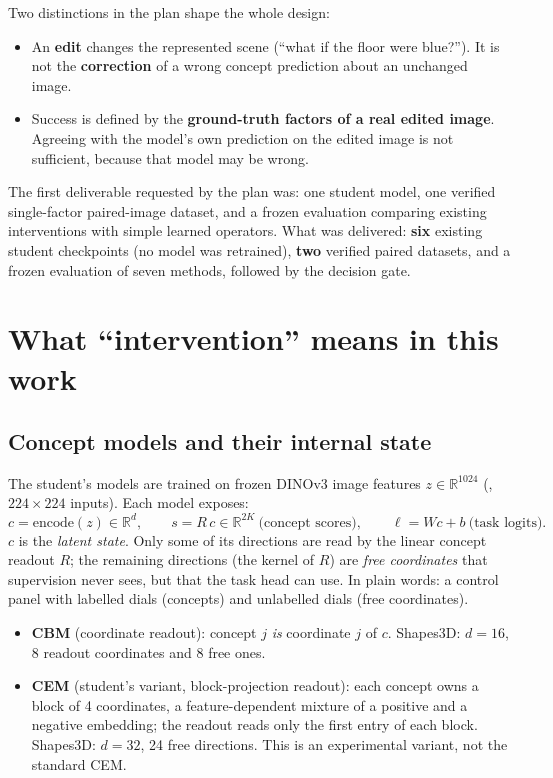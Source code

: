 \documentclass[11pt,a4paper]{article}
\newcommand{\code}[1]{\texttt{\detokenize{#1}}}
\begin{document}
Two distinctions in the plan shape the whole design:
\begin{itemize}
\item An \textbf{edit} changes the represented scene (``what if the floor were blue?''). It is not the
  \textbf{correction} of a wrong concept prediction about an unchanged image.
\item Success is defined by the \textbf{ground-truth factors of a real edited image}. Agreeing with the model's own
  prediction on the edited image is not sufficient, because that model may be wrong.
\end{itemize}

The first deliverable requested by the plan was: one student model, one verified single-factor paired-image dataset,
and a frozen evaluation comparing existing interventions with simple learned operators. What was delivered:
\textbf{six} existing student checkpoints (no model was retrained), \textbf{two} verified paired datasets, and a frozen
evaluation of seven methods, followed by the decision gate.

\section{What ``intervention'' means in this work}
\label{sec:intervention}

\subsection{Concept models and their internal state}

The student's models are trained on frozen DINOv3 image features $z\in\mathbb{R}^{1024}$
(\code{facebook/dinov3-vitl16-pretrain-lvd1689m}, $224\times224$ inputs). Each model exposes:
\[
c = \mathrm{encode}(z)\in\mathbb{R}^{d},\qquad
s = R\,c\in\mathbb{R}^{2K}\ \text{(concept scores)},\qquad
\ell = W c + b\ \text{(task logits)}.
\]
$c$ is the \emph{latent state}. Only some of its directions are read by the linear concept readout $R$; the
remaining directions (the kernel of $R$) are \emph{free coordinates} that supervision never sees, but that the task
head can use. In plain words: a control panel with labelled dials (concepts) and unlabelled dials (free coordinates).

\begin{itemize}
\item \textbf{CBM} (coordinate readout): concept $j$ \emph{is} coordinate $j$ of $c$. Shapes3D: $d=16$, 8 readout
  coordinates and 8 free ones.
\item \textbf{CEM} (student's variant, block-projection readout): each concept owns a block of 4 coordinates, a
  feature-dependent mixture of a positive and a negative embedding; the readout reads only the first entry of each
  block. Shapes3D: $d=32$, 24 free directions. This is an experimental variant, not the standard CEM.
\end{itemize}
\end{document}
